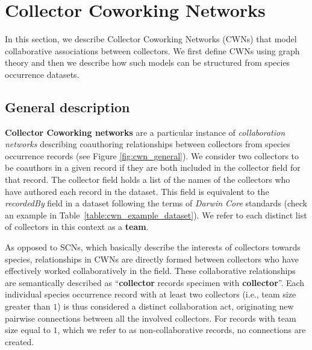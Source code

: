 {%
%

\section{Collector Coworking Networks} \label{section:cwn}
In this section, we describe Collector Coworking Networks (CWNs) that model collaborative associations between collectors.
We first define CWNs using graph theory and then we describe how such models can be structured from species occurrence datasets.

\subsection{General description}
\textbf{Collector Coworking networks} are a particular instance of \textit{collaboration networks} describing coauthoring relationships between collectors from species occurrence records (see Figure \ref{fig:cwn_general}).
We consider two collectors to be coauthors in a given record if they are both included in the collector field for that record. The collector field holds a list of the names of the collectors who have authored each record in the dataset. This field is equivalent to the \textit{recordedBy} field in a dataset following the terms of \textit{Darwin Core} standards (check an example in Table~\ref{table:cwn_example_dataset}). We refer to each distinct list of collectors in this context as a \textbf{team}.

As opposed to SCNs, which basically describe the interests of collectors towards species, relationships in CWNs are directly formed between collectors who have effectively worked collaboratively in the field. These collaborative relationships are semantically described as ``\textbf{collector} records specimen with \textbf{collector}''.
Each individual species occurrence record with at least two collectors (i.e., team size greater than $1$) is thus considered a distinct collaboration act, originating new pairwise connections between all the involved collectors.
For records with team size equal to $1$, which we refer to as non-collaborative records, no connections are created.

}
